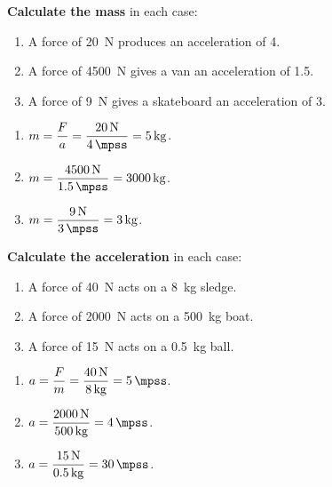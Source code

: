 \begin{exercise}
    \textbf{Calculate the mass} in each case:
    \begin{enumerate}[label=\letraminuscula]
        \item A force of \qty{20}{\newton} produces an acceleration of \qty{4}{\mpss}.
        \item A force of \qty{4500}{\newton} gives a van an acceleration of \qty{1.5}{\mpss}.
        \item A force of \qty{9}{\newton} gives a skateboard an acceleration of \qty{3}{\mpss}.
    \end{enumerate}
    \begin{solu}
        \begin{enumerate}[label=\alph*)]
            \item \(m = \dfrac{F}{a} = \dfrac{\qty{20}{\newton}}{\qty{4}{\mpss}} = \qty{5}{\kg}\).
            \item \(m = \dfrac{\qty{4500}{\newton}}{\qty{1.5}{\mpss}} = \qty{3000}{\kg}\).
            \item \(m = \dfrac{\qty{9}{\newton}}{\qty{3}{\mpss}} = \qty{3}{\kg}\).
        \end{enumerate}
    \end{solu}
\end{exercise}

\begin{exercise}
    \textbf{Calculate the acceleration} in each case:
    \begin{enumerate}[label=\letraminuscula]
        \item A force of \qty{40}{\newton} acts on a \qty{8}{\kg} sledge.
        \item A force of \qty{2000}{\newton} acts on a \qty{500}{\kg} boat.
        \item A force of \qty{15}{\newton} acts on a \qty{0.5}{\kg} ball.
    \end{enumerate}
    \begin{solu}
        \begin{enumerate}[label=\alph*)]
            \item \(a = \dfrac{F}{m} = \dfrac{\qty{40}{\newton}}{\qty{8}{\kg}} = \qty{5}{\mpss}\).
            \item \(a = \dfrac{\qty{2000}{\newton}}{\qty{500}{\kg}} = \qty{4}{\mpss}\).
            \item \(a = \dfrac{\qty{15}{\newton}}{\qty{0.5}{\kg}} = \qty{30}{\mpss}\).
        \end{enumerate}
    \end{solu}
\end{exercise}

